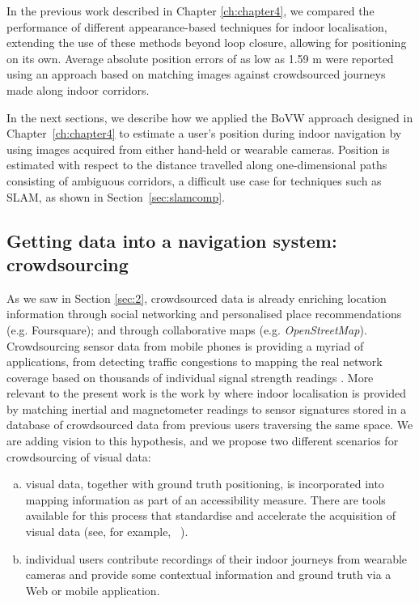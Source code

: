 In the previous work \citep{RiveraWearable} described in Chapter \ref{ch:chapter4}, we compared the performance of different appearance-based techniques for indoor localisation, extending the use of these methods beyond loop closure, allowing for positioning on its own. Average absolute position errors of as low as 1.59 m were reported using an approach based on matching images against crowdsourced journeys made along indoor corridors. 

In the next sections, we describe how we applied the BoVW approach designed in Chapter~\ref{ch:chapter4} to estimate a user's position during indoor navigation by using images acquired from either hand-held or wearable cameras.  Position is estimated with respect to the distance travelled along one-dimensional paths consisting of ambiguous corridors, a difficult use case for techniques such as SLAM, as shown in Section~\ref{sec:slamcomp}.

\subsection{Getting data into a navigation system: crowdsourcing}
As we saw in Section \ref{sec:2}, crowdsourced data is already enriching location information through social networking and personalised place recommendations (e.g. Foursquare); and through collaborative maps (e.g. \textit{OpenStreetMap}). Crowdsourcing sensor data from mobile phones is providing a myriad of applications, from detecting traffic congestions \citep{barth2009bright} to mapping the real network coverage based on thousands of individual signal strength readings \citep{ltereport2013android}. More relevant to the present work is the work by \citet{wang2012no} where indoor localisation is provided by matching inertial and magnetometer readings to sensor signatures stored in a database of crowdsourced data from previous users traversing the same space. We are adding vision to this hypothesis, and we propose two different scenarios for crowdsourcing of visual data:
\begin{enumerate}[a)] 
\item visual data, together with ground truth positioning, is incorporated into mapping information as part of an accessibility measure. There are tools available for this process that standardise and accelerate the acquisition of visual data (see, for example, ~\citep{navvisTrolley}).
\item individual users contribute recordings of their indoor journeys from wearable cameras and provide some contextual information and ground truth via a Web or mobile application. 
\end{enumerate}

